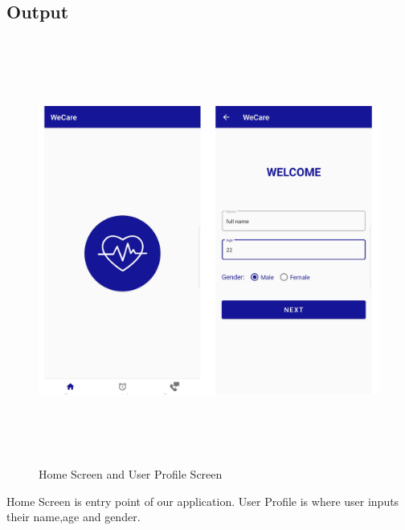 {\subsection{Output}


\begin{figure}[H]
\begin{center}
\includegraphics[width=155mm, height = 140mm]{Outputnew/1.png}
\caption{Home Screen and User Profile Screen}
\end{center}
\end{figure}

Home Screen is entry point of our application. User Profile is where user inputs their name,age and gender.

}
